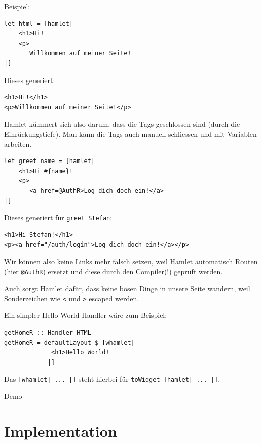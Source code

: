 \documentclass{beamer}
\begin{document}
\begin{frame}[fragile]
Beispiel:\\\par
\begin{verbatim}
let html = [hamlet|
    <h1>Hi!
    <p>
       Willkommen auf meiner Seite!
|]
\end{verbatim}
\pause
Dieses generiert:
\begin{verbatim}
<h1>Hi!</h1>
<p>Willkommen auf meiner Seite!</p>
\end{verbatim}
\pause
Hamlet kümmert sich also darum, dass die Tags geschlossen sind (durch die Einrückungstiefe). Man kann die Tags auch manuell schliessen und mit Variablen arbeiten.
\end{frame}

\begin{frame}[fragile]
\begin{verbatim}
let greet name = [hamlet|
    <h1>Hi #{name}!
    <p>
       <a href=@AuthR>Log dich doch ein!</a>
|]
\end{verbatim}
\pause
Dieses generiert für \texttt{greet \glqq Stefan\grqq}:
\begin{verbatim}
<h1>Hi Stefan!</h1>
<p><a href="/auth/login">Log dich doch ein!</a></p>
\end{verbatim}
\pause
Wir können also keine Links mehr falsch setzen, weil Hamlet automatisch Routen (hier \texttt{@AuthR}) ersetzt und diese durch den Compiler(!) geprüft werden.\\\pause\par
Auch sorgt Hamlet dafür, dass keine bösen Dinge in unsere Seite wandern, weil Sonderzeichen wie \texttt{<} und \texttt{>} escaped werden.
\end{frame}

\begin{frame}[fragile]
Ein simpler Hello-World-Handler wäre zum Beispiel:
\bigskip

\begin{verbatim}
getHomeR :: Handler HTML
getHomeR = defaultLayout $ [whamlet|
             <h1>Hello World!
            |]
\end{verbatim}
\pause
\bigskip

Das \texttt{[whamlet| ... |]} steht hierbei für \texttt{toWidget [hamlet| ... |]}.
\end{frame}

\begin{frame}
Demo
\end{frame}


\section{Implementation}
\end{document}
